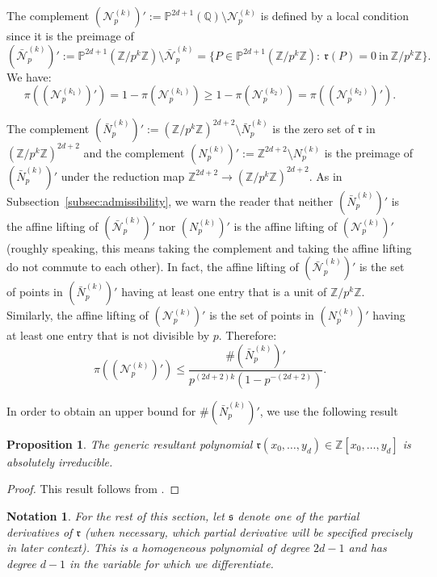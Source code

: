 \documentclass[12pt]{amsart}
\newtheorem{notn}[theorem]{Notation}
\newtheorem{proposition}[theorem]{Proposition}
\newcommand{\cN}{\mathcal{N}}
\newcommand{\Z}{\mathbb{Z}}
\newcommand{\Q}{\mathbb{Q}}
\numberwithin{equation}{section}
\begin{document}
The complement $(\cN_p^{(k)})':=\mathbb{P}^{2d+1}(\Q)\setminus\cN_p^{(k)}$
is defined by a local condition since it is the preimage of
$$(\bar{\cN}_p^{(k)})':=\mathbb{P}^{2d+1}(\Z/p^k\Z)\setminus\bar{\cN}_p^{(k)}= \{P\in\mathbb{P}^{2d+1}(\Z/p^k\Z):\ \mathfrak{r}(P)=0\ \text{in}\ \Z/p^k\Z\}.$$
We have:
\begin{equation}\label{eq:piNk1'>piNk2'}
\pi((\cN_p^{(k_1)})')=1-\pi(\cN_p^{(k_1)})\geq 1-\pi(\cN_p^{(k_2)})=\pi((\cN_p^{(k_2)})').
\end{equation}


The complement $(\bar{N}_p^{(k)})':=(\Z/p^k\Z)^{2d+2}\setminus\bar{N}_p^{(k)}$ is the zero set of 
$\mathfrak{r}$ in $(\Z/p^k\Z)^{2d+2}$ and the complement $(N_p^{(k)})':=\Z^{2d+2}\setminus N_p^{(k)}$ is the preimage of $(\bar{N}_p^{(k)})'$ under the reduction map
$\Z^{2d+2}\rightarrow(\Z/p^k\Z)^{2d+2}$. As in Subsection~\ref{subsec:admissibility}, we warn the reader that neither $(\bar{N}_p^{(k)})'$ is the affine lifting of $(\bar{\cN}_p^{(k)})'$
nor $(N_p^{(k)})'$ is the affine lifting of $(\cN_p^{(k)})'$ (roughly speaking, this means taking the complement and taking the affine lifting do not commute to each other). In fact, the affine lifting of $(\bar{\cN}_p^{(k)})'$ is the set of points in $(\bar{N}_p^{(k)})'$ having at least one entry that is a unit of $\Z/p^k\Z$. Similarly, the affine lifting of
$(\cN_p^{(k)})'$ is the set of points in $(N_p^{(k)})'$ having at least one entry that is not divisible by $p$. Therefore:
\begin{equation}\label{eq:pi cNpk complement}
    \pi((\cN_p^{(k)})')\leq \frac{\# (\bar{N}_p^{(k)})'}{p^{(2d+2)k}(1-p^{-(2d+2)})}.
\end{equation}




In order to obtain an upper bound for $\# (\bar{N}_p^{(k)})'$, we use the following result
\begin{proposition}\label{f irred}
    The generic resultant polynomial $\mathfrak{r}(x_0,\ldots,y_d)\in\Z[x_0,\ldots,y_d]$ is absolutely irreducible. 
\end{proposition}
\begin{proof}
    This result follows from \cite[Ch.3, Proposition 3.1 and Example 3.6]{GKZ}.
\end{proof}

\begin{notn}
For the rest of this section, let $\mathfrak{s}$ denote one of the partial derivatives of $\mathfrak{r}$ (when necessary, which partial derivative will be specified precisely in later context). This  is a homogeneous polynomial of degree $2d-1$ and has degree $d-1$ in the variable for which we differentiate.    
\end{notn}
\end{document}
